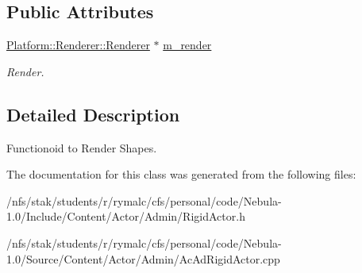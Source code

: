 \subsection*{Public Attributes}
\begin{DoxyCompactItemize}
\item 
\hypertarget{classFunct__Shape__Render_a409625ba5c43555475262c5b37d98b68}{
\hyperlink{classPlatform_1_1Renderer_1_1Renderer}{Platform::Renderer::Renderer} $\ast$ \hyperlink{classFunct__Shape__Render_a409625ba5c43555475262c5b37d98b68}{m\_\-render}}
\label{classFunct__Shape__Render_a409625ba5c43555475262c5b37d98b68}

\begin{DoxyCompactList}\small\item\em Render. \item\end{DoxyCompactList}\end{DoxyCompactItemize}


\subsection{Detailed Description}
Functionoid to Render Shapes. 

The documentation for this class was generated from the following files:\begin{DoxyCompactItemize}
\item 
/nfs/stak/students/r/rymalc/cfs/personal/code/Nebula-\/1.0/Include/Content/Actor/Admin/RigidActor.h\item 
/nfs/stak/students/r/rymalc/cfs/personal/code/Nebula-\/1.0/Source/Content/Actor/Admin/AcAdRigidActor.cpp\end{DoxyCompactItemize}
